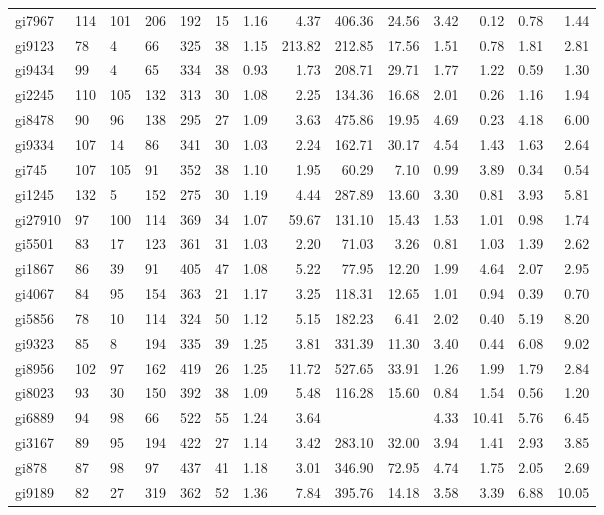 {\begin{longtable}{l lllll rrrr rrrr }
gi7967 & 114 & 101 & 206 & 192 & 15 & 1.16 & 4.37 & 406.36 & 24.56 & 3.42 & 0.12 & 0.78 & 1.44 \\
gi9123 & 78 & 4 & 66 & 325 & 38 & 1.15 & 213.82 & 212.85 & 17.56 & 1.51 & 0.78 & 1.81 & 2.81 \\
gi9434 & 99 & 4 & 65 & 334 & 38 & 0.93 & 1.73 & 208.71 & 29.71 & 1.77 & 1.22 & 0.59 & 1.30 \\
gi2245 & 110 & 105 & 132 & 313 & 30 & 1.08 & 2.25 & 134.36 & 16.68 & 2.01 & 0.26 & 1.16 & 1.94 \\
gi8478 & 90 & 96 & 138 & 295 & 27 & 1.09 & 3.63 & 475.86 & 19.95 & 4.69 & 0.23 & 4.18 & 6.00 \\
gi9334 & 107 & 14 & 86 & 341 & 30 & 1.03 & 2.24 & 162.71 & 30.17 & 4.54 & 1.43 & 1.63 & 2.64 \\
gi745 & 107 & 105 & 91 & 352 & 38 & 1.10 & 1.95 & 60.29 & 7.10 & 0.99 & 3.89 & 0.34 & 0.54 \\
gi1245 & 132 & 5 & 152 & 275 & 30 & 1.19 & 4.44 & 287.89 & 13.60 & 3.30 & 0.81 & 3.93 & 5.81 \\
gi27910 & 97 & 100 & 114 & 369 & 34 & 1.07 & 59.67 & 131.10 & 15.43 & 1.53 & 1.01 & 0.98 & 1.74 \\
gi5501 & 83 & 17 & 123 & 361 & 31 & 1.03 & 2.20 & 71.03 & 3.26 & 0.81 & 1.03 & 1.39 & 2.62 \\
gi1867 & 86 & 39 & 91 & 405 & 47 & 1.08 & 5.22 & 77.95 & 12.20 & 1.99 & 4.64 & 2.07 & 2.95 \\
gi4067 & 84 & 95 & 154 & 363 & 21 & 1.17 & 3.25 & 118.31 & 12.65 & 1.01 & 0.94 & 0.39 & 0.70 \\
gi5856 & 78 & 10 & 114 & 324 & 50 & 1.12 & 5.15 & 182.23 & 6.41 & 2.02 & 0.40 & 5.19 & 8.20 \\
gi9323 & 85 & 8 & 194 & 335 & 39 & 1.25 & 3.81 & 331.39 & 11.30 & 3.40 & 0.44 & 6.08 & 9.02 \\
gi8956 & 102 & 97 & 162 & 419 & 26 & 1.25 & 11.72 & 527.65 & 33.91 & 1.26 & 1.99 & 1.79 & 2.84 \\
gi8023 & 93 & 30 & 150 & 392 & 38 & 1.09 & 5.48 & 116.28 & 15.60 & 0.84 & 1.54 & 0.56 & 1.20 \\
gi6889 & 94 & 98 & 66 & 522 & 55 & 1.24 & 3.64 &  &  & 4.33 & 10.41 & 5.76 & 6.45 \\
gi3167 & 89 & 95 & 194 & 422 & 27 & 1.14 & 3.42 & 283.10 & 32.00 & 3.94 & 1.41 & 2.93 & 3.85 \\
gi878 & 87 & 98 & 97 & 437 & 41 & 1.18 & 3.01 & 346.90 & 72.95 & 4.74 & 1.75 & 2.05 & 2.69 \\
gi9189 & 82 & 27 & 319 & 362 & 52 & 1.36 & 7.84 & 395.76 & 14.18 & 3.58 & 3.39 & 6.88 & 10.05 \\

\end{longtable}}
